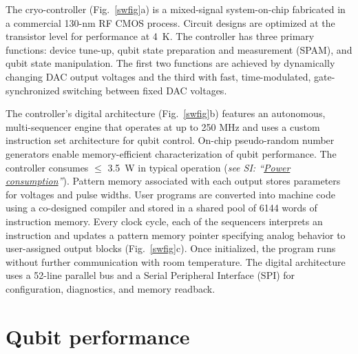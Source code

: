 \documentclass[aps,prl,twocolumn,superscriptaddress,nobibnotes,10pt,floatfix]{revtex4-2}
\newcommand{\figsubref}[2]{Fig.~\ref{#1}{#2}}
\newcommand{\SIlink}[2]{\textit{see SI: ``\hyperref[#2]{#1}''}}
\begin{document}
	The cryo-controller (\figsubref{swfig}{a}) is a mixed-signal system-on-chip fabricated in a commercial 130-nm RF CMOS process.
	Circuit designs are optimized at the transistor level for performance at 4~K.
	The controller has three primary functions: device tune-up, qubit state preparation and measurement (SPAM), and qubit state manipulation.
	The first two functions are achieved by dynamically changing DAC output voltages and the third with fast, time-modulated, gate-synchronized switching between fixed DAC voltages.

	The controller's digital architecture (\figsubref{swfig}{b}) features an autonomous, multi-sequencer engine that operates at up to 250 MHz and uses a custom instruction set architecture for qubit control.
	On-chip pseudo-random number generators enable memory-efficient characterization of qubit performance.
	The controller consumes $\le$ 3.5~W in typical operation (\SIlink{Power consumption}{power-consumption}).
	Pattern memory associated with each output stores parameters for voltages and pulse widths.
	User programs are converted into machine code using a co-designed compiler and stored in a shared pool of 6144 words of instruction memory.
	Every clock cycle, each of the sequencers interprets an instruction and updates a pattern memory pointer specifying analog behavior to user-assigned output blocks (\figsubref{swfig}{c}).
	Once initialized, the program runs without further communication with room temperature.
	The digital architecture uses a 52-line parallel bus and a Serial Peripheral Interface (SPI) for configuration, diagnostics, and memory readback.

	\section{Qubit performance}\label{qubit-performance}
\end{document}
